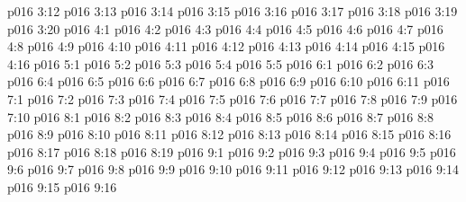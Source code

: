 \vs p016 3:12 \pc 
\vs p016 3:13 
\vs p016 3:14 \pc 
\vs p016 3:15 
\vs p016 3:16 
\vs p016 3:17 
\vs p016 3:18 
\vs p016 3:19 
\vs p016 3:20 
\vs p016 4:1 
\vs p016 4:2 
\vs p016 4:3 
\vs p016 4:4 
\vs p016 4:5 
\vs p016 4:6 
\vs p016 4:7 
\vs p016 4:8 \pc 
\vs p016 4:9 
\vs p016 4:10 
\vs p016 4:11 
\vs p016 4:12 
\vs p016 4:13 
\vs p016 4:14 
\vs p016 4:15 
\vs p016 4:16 \pc 
{}
\vs p016 5:1 
\vs p016 5:2 
\vs p016 5:3 
\vs p016 5:4 
\vs p016 5:5 
\vs p016 6:1 
\vs p016 6:2 
\vs p016 6:3 
\vs p016 6:4 \pc 
\vs p016 6:5 
\vs p016 6:6 
\vs p016 6:7 
\vs p016 6:8 
\vs p016 6:9 \pc 
\vs p016 6:10 \pc 
\vs p016 6:11 
\vs p016 7:1 
\vs p016 7:2 
\vs p016 7:3 
\vs p016 7:4 
\vs p016 7:5 
\vs p016 7:6 \pc 
\vs p016 7:7 
\vs p016 7:8 \pc 
\vs p016 7:9 \pc 
\vs p016 7:10 
\vs p016 8:1 
\vs p016 8:2 
\vs p016 8:3 
\vs p016 8:4 
\vs p016 8:5 \pc 
\vs p016 8:6 
\vs p016 8:7 \pc 
\vs p016 8:8 
\vs p016 8:9 
\vs p016 8:10 
\vs p016 8:11 
\vs p016 8:12 
\vs p016 8:13 
\vs p016 8:14 
\vs p016 8:15 \pc 
\vs p016 8:16 
\vs p016 8:17 
\vs p016 8:18 
\vs p016 8:19 \pc 
{}
\vs p016 9:1 
\vs p016 9:2 
\vs p016 9:3 
\vs p016 9:4 \pc 
\vs p016 9:5 
\vs p016 9:6 
\vs p016 9:7 \pc 
\vs p016 9:8 
\vs p016 9:9 
\vs p016 9:10 
\vs p016 9:11 
\vs p016 9:12 
\vs p016 9:13 
\vs p016 9:14 \pc 
\vs p016 9:15 
\vsetoff
\vs p016 9:16 
\quizlink
